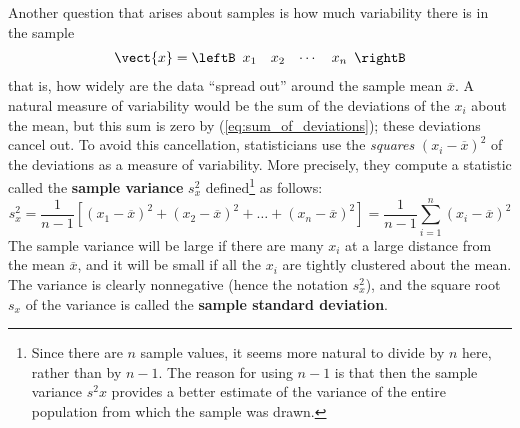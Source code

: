 Another question that arises about samples is how much variability there is in the sample 
\begin{equation*}
\vect{x} = 
\leftB \begin{array}{cccc}
x_{1} & x_{2} & \cdots & x_{n}
\end{array} \rightB
\end{equation*}
 that is, how widely are the data ``spread out'' around the sample mean $\overline{x}$. A natural measure of variability would be the sum of the deviations of the $x_{i}$ about the mean, but this sum is zero by (\ref{eq:sum_of_deviations}); these deviations cancel out. To avoid this cancellation, statisticians use the \textit{squares} $(x_{i} - \overline{x})^{2}$ of the deviations as a measure of variability. More precisely, they compute a statistic called the \textbf{sample variance} $s_x^2$ defined\footnote{Since there are $n$ sample values, it seems more natural to divide by $n$ here, rather than by $n - 1$. The reason for using $n - 1$ is that then the sample variance $s^{2}x$ provides a better estimate of the variance of the entire population from which the sample was drawn.}
 as follows:
\begin{equation*}
s_x^2 = \frac{1}{n - 1}[(x_1 - \overline{x})^2 + (x_2 - \overline{x})^2 + \dots + (x_n - \overline{x})^2] = \frac{1}{n - 1}\sum_{i = 1}^{n} (x_i - \overline{x})^2
\end{equation*}
The sample variance will be large if there are many $x_{i}$ at a large distance from the mean $\overline{x}$, and it will be small if all the $x_{i}$ are tightly clustered about the mean. The variance is clearly nonnegative (hence the notation $s_x^2$), and the square root $s_{x}$ of the variance is called the \textbf{sample standard deviation}.

